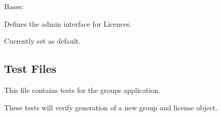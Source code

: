 \documentclass[letterpaper,10pt,english]{sphinxmanual}
\begin{document}

\begin{fulllineitems}
\label{api:groups.admin.LicenseAdmin}
Bases: 

Defines the admin interface for Licences.

Currently set as default.

\begin{fulllineitems}
\label{api:groups.admin.LicenseAdmin.media}
\end{fulllineitems}


\end{fulllineitems}



\subsection{Test Files}
\label{api:id14}\label{api:module-groups.tests}
This file contains tests for the groups application.

These tests will verify generation of a new group and license object.
\end{document}
